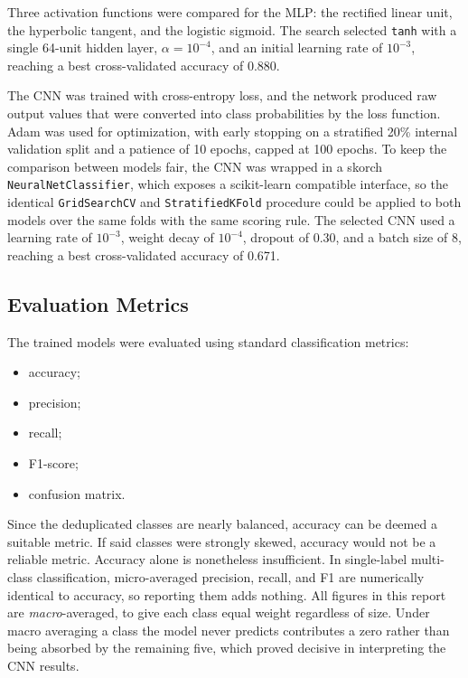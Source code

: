 \documentclass[conference]{IEEEtran}
\begin{document}
Three activation functions were compared for the MLP: the rectified linear unit,
the hyperbolic tangent, and the logistic sigmoid. 
The search selected \texttt{tanh} with a single 64-unit hidden layer,
$\alpha = 10^{-4}$, and an initial learning rate of $10^{-3}$, reaching a best
cross-validated accuracy of 0.880.

The CNN was trained with cross-entropy loss, and the network produced raw output values that were converted into class probabilities by the loss function.
Adam was used for optimization, with early stopping on a stratified
20\% internal validation split and a patience of 10 epochs, capped at 100 epochs.
To keep the comparison between models fair, the CNN was wrapped in a
skorch \texttt{NeuralNetClassifier}, which exposes a scikit-learn
compatible interface, so the identical \texttt{GridSearchCV} and
\texttt{StratifiedKFold} procedure could be applied to both models over the same
folds with the same scoring rule. The selected CNN used a learning rate of
$10^{-3}$, weight decay of $10^{-4}$, dropout of 0.30, and a batch size of 8,
reaching a best cross-validated accuracy of 0.671.

\subsection{Evaluation Metrics}
The trained models were evaluated using standard classification metrics:

\begin{itemize}
    \item accuracy;
    \item precision;
    \item recall;
    \item F1-score;
    \item confusion matrix.
\end{itemize}

Since the deduplicated classes are nearly balanced, accuracy can be deemed a suitable metric. 
If said classes were strongly skewed, accuracy would not be a reliable metric.
Accuracy alone is nonetheless insufficient. In single-label multi-class
classification, micro-averaged precision, recall, and F1 are numerically
identical to accuracy, so reporting them adds nothing. All figures in this
report are \emph{macro}-averaged, to give each class equal weight
regardless of size. Under macro averaging a class the model never predicts
contributes a zero rather than being absorbed by the remaining five, which proved
decisive in interpreting the CNN results.
\end{document}
